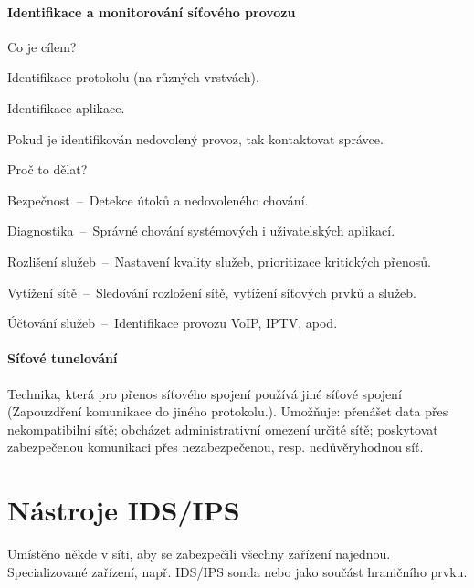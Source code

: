 \paragraph*{Identifikace a monitorování síťového provozu} \begin{compactitem}
    \item Co je cílem? \begin{compactitem}
        \item Identifikace protokolu (na různých vrstvách).
        \item Identifikace aplikace.
        \item Pokud je identifikován nedovolený provoz, tak kontaktovat správce.
    \end{compactitem}
    \item Proč to dělat? \begin{compactitem}
        \item Bezpečnost~--~Detekce útoků a nedovoleného chování.
        \item Diagnostika~--~Správné chování systémových i uživatelských aplikací.
        \item Rozlišení služeb~--~Nastavení kvality služeb, prioritizace kritických přenosů.
        \item Vytížení sítě~--~Sledování rozložení sítě, vytížení síťových prvků a služeb.
        \item Účtování služeb~--~Identifikace provozu VoIP, IPTV, apod.
    \end{compactitem}
\end{compactitem}

\paragraph*{Síťové tunelování} Technika, která pro přenos síťového spojení používá jiné síťové spojení (Zapouzdření komunikace do jiného protokolu.). Umožňuje: přenášet data přes nekompatibilní sítě; obcházet administrativní omezení určité sítě; poskytovat zabezpečenou komunikaci přes nezabezpečenou, resp. nedůvěryhodnou síť.


\section{Nástroje IDS/IPS}

Umístěno někde v síti, aby se zabezpečili všechny zařízení najednou. Specializované zařízení, např. IDS/IPS sonda nebo jako součást hraničního prvku.

